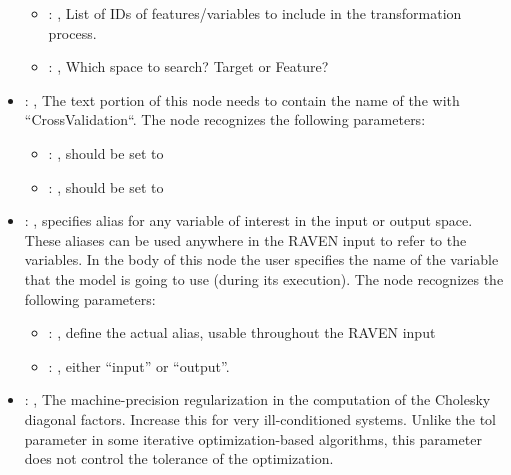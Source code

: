 \begin{itemize}
\begin{itemize}
        \item {}: , 
          List of IDs of features/variables to include in the transformation process.

        \item {}: , 
          Which space to search? Target or Feature?
      \end{itemize}

    \item {}: , 
      The text portion of this node needs to contain the name of the  with
               ``CrossValidation``.
      The  node recognizes the following parameters:
        \begin{itemize}
          \item {}: , 
            should be set to 
          \item {}: , 
            should be set to 
      \end{itemize}

    \item {}: , 
      specifies alias for         any variable of interest in the input or output space. These
      aliases can be used anywhere in the RAVEN input to         refer to the variables. In the body
      of this node the user specifies the name of the variable that the model is going to use
      (during its execution).
      The  node recognizes the following parameters:
        \begin{itemize}
          \item {}: , 
            define the actual alias, usable throughout the RAVEN input
          \item {}: , 
            either ``input'' or ``output''.
      \end{itemize}

    \item {}: , 
      The machine-precision regularization in the computation of the Cholesky
      diagonal factors. Increase this for very ill-conditioned systems. Unlike the tol
      parameter in some iterative optimization-based algorithms, this parameter does not
      control the tolerance of the optimization.


\end{itemize}
